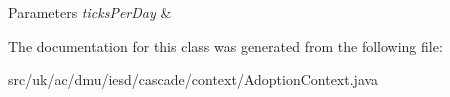 \begin{DoxyParams}{Parameters}
{\em ticks\-Per\-Day} & \\
\hline
\end{DoxyParams}


The documentation for this class was generated from the following file\-:\begin{DoxyCompactItemize}
\item 
src/uk/ac/dmu/iesd/cascade/context/Adoption\-Context.\-java\end{DoxyCompactItemize}
